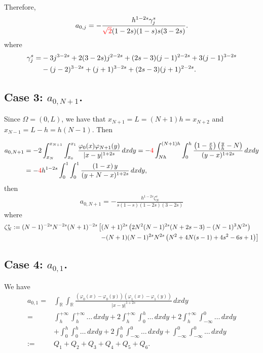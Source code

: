 \documentclass[11 pt]{article}
\numberwithin{equation}{section}
\newcommand{\RR}{\mathbb{R}}
\newcommand{\B}[1]{{\color{red} #1}}  %
\begin{document}
Therefore,
\begin{align*}
	a_{0,j} =-\frac{h^{1-2 s} \gamma_j^s }{\B{\sqrt{2}}(1-2 s) (1-s) s (3- 2s )}.
\end{align*} 
where
%
\begin{align}\notag
\gamma_j^s= &-3 j^{3-2 s}+2 (3-2 s) j^{2-2 s}+(2 s-3)
   (j-1)^{2-2 s}+3 (j-1)^{3-2 s} \\ \label{eq:def_gamma_j}
   &-(j-2)^{3-2 s}+(j+1)^{3-2 s}+(2
   s-3) (j+1)^{2-2 s}.
\end{align}
%

\subsection{Case 3: $a_{0,N+1}$.} Since $\Omega=(0,L)$, we have that $x_{N+1}=L=(N+1)h=x_{N+2}$ and $x_{N-1}=L-h=h(N-1)$. Then

\begin{align*}
a_{0,N+1}&=-2 \int_{x_{N}}^{x_{N+1}}\int_{x_0}^{x_1}\frac{\varphi_0(x)\varphi_{N+1}(y)}{|x-y|^{1+2s}}\,dxdy
=-\B{4}\int_{Nh}^{(N+1)h}\int_0^{h}\frac{\left(1-\frac{x}{h}\right)\left(\frac{y}{h}-N\right)}{(y-x)^{1+2s}}\,dxdy\\
&=-\B{4}h^{1-2s}\int_{0}^{1}\int_0^{1}\frac{\left(1-x\right)y}{(y+N-x)^{1+2s}}\,dxdy,
\end{align*}
then
%
\begin{align*}
a_{0,N+1} = -\frac{h^{1-2 s} \zeta_N^s }{s(1-s)(1-2s )(3-2 s)}
\end{align*}
%
where 
%
\begin{align}\notag 
\zeta_N^s:= (N-1)^{-2 s} N^{-2 s} (N+1)^{-2 s}
   &\left[(N+1)^{2 s} \left(2 N^2 (N-1)^{2 s} (N+2 s-3)-(N-1)^3
   N^{2 s}\right) \right. \\  & \label{eq:def_zeta_N} \;
   \left. -(N+1) (N-1)^{2 s} N^{2 s} \left(N^2+4 N (s-1)+4
   s^2-6 s+1\right)\right]
\end{align}
%


\subsection{Case 4: $a_{0,1}$.}

We have 
	\begin{align*}
	a_{0,1}= & \int_{\RR}\int_{\RR}\frac{(\varphi_0(x)-\varphi_0(y))(\varphi_{1}(x)-\varphi_{1}(y))}{|x-y|^{1+2s}}\,dxdy
	\\
	= & \int_{h}^{+\infty}\int_{h}^{+\infty} \ldots\,dxdy + 2\int_{h}^{+\infty}\int_{0}^{h} \ldots\,dxdy + 2\int_{h}^{+\infty}\int_{-\infty}^{0} \ldots\,dxdy 
	\\
	& + \int_{0}^{h}\int_{0}^{h} \ldots\,dxdy + 2\int_{0}^{h}\int_{-\infty}^{0} \ldots\,dxdy + \int_{-\infty}^{0}\int_{-\infty}^{0} \ldots\,dxdy 
	\\
	:= & Q_1 + Q_2 + Q_3 + Q_4 + Q_5 + Q_6.
\end{align*}
\end{document}
